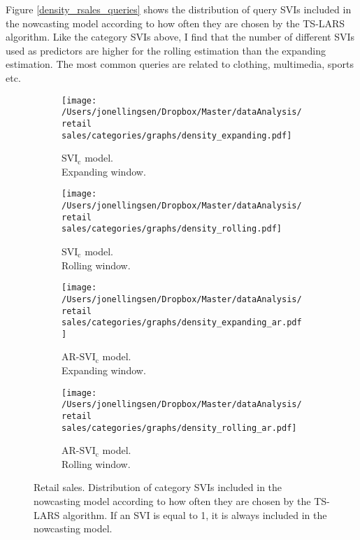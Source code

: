 Figure \ref{density_rsales_queries} shows the distribution of query SVIs included in the nowcasting model according to how often they are chosen by the TS-LARS algorithm. Like the category SVIs above, I find that the number of different SVIs used as predictors are higher for the rolling estimation than the expanding estimation. The most common queries are related to clothing, multimedia, sports etc.

\begin{figure}[H]
    \centering
    \begin{subfigure}[b]{0.45\textwidth}
\caption{$\text{SVI}_\text{c}$ model.\\Expanding window.}
\label{density_plain_expanding_categories}
        \texttt{[image: /Users/jonellingsen/Dropbox/Master/dataAnalysis/retail sales/categories/graphs/density\_expanding.pdf]}
    \end{subfigure}
    \begin{subfigure}[b]{0.45\textwidth}
\caption{$\text{SVI}_\text{c}$ model.\\Rolling window.}
\label{density_plain_rolling_categories}
        \texttt{[image: /Users/jonellingsen/Dropbox/Master/dataAnalysis/retail sales/categories/graphs/density\_rolling.pdf]}
    \end{subfigure}
\begin{subfigure}[b]{0.45\textwidth}
\caption{AR-$\text{SVI}_\text{c}$ model.\\Expanding window.}
\label{density_ar_expanding_categories}       
\texttt{[image: /Users/jonellingsen/Dropbox/Master/dataAnalysis/retail sales/categories/graphs/density\_expanding\_ar.pdf]}
    \end{subfigure}
\begin{subfigure}[b]{0.45\textwidth}
\caption{AR-$\text{SVI}_\text{c}$ model.\\Rolling window.}
\label{density_ar_rolling_categories}       
\texttt{[image: /Users/jonellingsen/Dropbox/Master/dataAnalysis/retail sales/categories/graphs/density\_rolling\_ar.pdf]}
    \end{subfigure}
\caption{Retail sales. Distribution of category SVIs included in the nowcasting model according to how often they are chosen by the TS-LARS algorithm. If an SVI is equal to 1, it is always included in the nowcasting model.}
\label{density_rsales_categories}
\end{figure}
